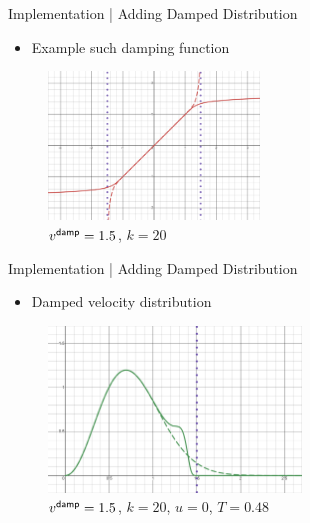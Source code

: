     \begin{frame}{Implementation | Adding Damped Distribution}
        \begin{itemize}
            \item  Example such damping function
        \end{itemize}
        \begin{figure}
            \centering
            \includegraphics[width = 0.5\textwidth]{2 - implementation/2 - adding damped backgrounds/images/example damping function.png}
            \caption{$v^{\sf damp} = 1.5$, $k = 20$}
        \end{figure}
    \end{frame}
    
    \begin{frame}{Implementation | Adding Damped Distribution}
        \begin{itemize}
            \item  Damped velocity distribution
        \end{itemize}
        \begin{figure}
            \centering
            \includegraphics[width = 0.6\textwidth]{2 - implementation/2 - adding damped backgrounds/images/example velocity distribution.png}
            \caption{$v^{\sf damp} = 1.5$, $k = 20$, $u = 0$, $T = 0.48$}
        \end{figure}
    \end{frame}
    
